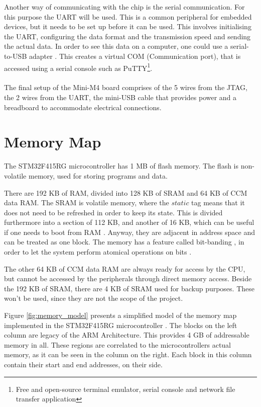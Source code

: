 Another way of communicating with the chip is the serial communication.
For this purpose the UART will be used. This is a common peripheral for 
embedded devices, but it needs to be set up before it can be used. This
involves initialising the UART, configuring the data format and the
transmission speed and sending the actual data. In order to see this data
on a computer, one could use a serial-to-USB adapter \cite{ttl_usb}.
This creates a virtual COM (Communication port), that is accessed using
a serial console such as PuTTY\footnote{Free and open-source terminal emulator, serial console and network file transfer application}.
\\\\
The final setup of the Mini-M4 board comprises of the 5 wires from the JTAG,
the 2 wires from the UART, the mini-USB cable that provides power and a
breadboard to accommodate electrical connections.

\section{Memory Map}
\label{sec:memory_map}
The STM32F415RG microcontroller has 1 MB of flash memory. The flash 
is non-volatile memory, used for storing programs and
data.

There are 192 KB of RAM, divided into 128 KB of SRAM and 64 KB of 
CCM data RAM.
The SRAM is volatile memory, where the $static$ tag means 
that it does not need to be refreshed in order to
keep its state. This is divided furthermore into a section of 112 KB, and 
another of 16 KB, which can be useful if one needs to boot from RAM
\cite{run_from_ram}. Anyway, they are adjacent in address space and can be
treated as one block.
The memory has a feature called bit-banding , in order to let the system
perform atomical operations on bits \cite{bit_banding}.

The other 64 KB of CCM data RAM are always ready for access by the CPU,
but cannot be accessed by the peripherals through direct memory access.
Beside the 192 KB of SRAM, there are 4 KB of SRAM used for backup purposes.
These won't be used, since they are not the scope of the project.

Figure \ref{fig:memory_model} presents a simplified model of the 
memory map implemented in the STM32F415RG microcontroller
\cite{stm32_datasheet_74}. The blocks
on the left column are legacy of the ARM Architecture. This provides 
4 GB of addressable memory in all.
These regions are correlated to the microcontroller\textquotesingle s
actual memory, as it can be seen in the column on the right. Each block
in this column contain their start and end addresses, on their side.

